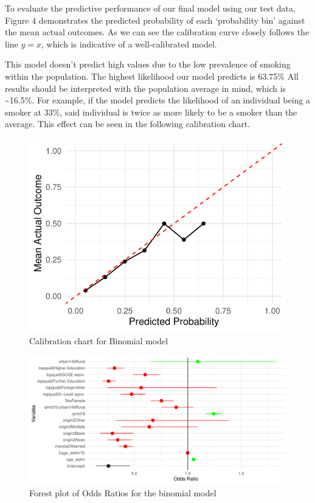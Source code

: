 \documentclass[
  11pt,
  twocolumn]{article}
\begin{document}
To evaluate the predictive performance of our final model using our test
data, Figure 4 demonstrates the predicted probability of each
`probability bin' against the mean actual outcomes. As we can see the
calibration curve closely follows the line \(y = x\), which is
indicative of a well-calibrated model.

This model doesn't predict high values due to the low prevalence of
smoking within the population. The highest likelihood our model predicts
is 63.75\% All results should be interpreted with the population average
in mind, which is \textasciitilde16.5\%. For example, if the model
predicts the likelihood of an individual being a smoker at 33\%, said
individual is twice as more likely to be a smoker than the average. This
effect can be seen in the following calibration chart.

\begin{figure}[H]

{\centering \includegraphics{Coursework_files/figure-latex/output-calibration-chart-1} 

}

\caption{Calibration chart for Binomial model}\label{fig:output-calibration-chart}
\end{figure}

\begin{figure}[H]
\includegraphics{Coursework_files/figure-latex/output-forest-plot-1} \caption{Forest plot of Odds Ratios for the binomial model}\label{fig:output-forest-plot}
\end{figure}
\end{document}
